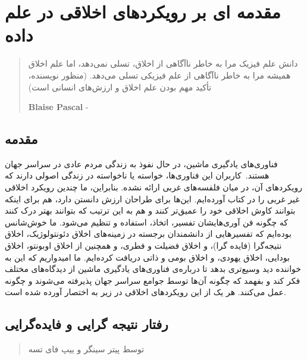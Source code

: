 

\chapter{مقدمه ای بر رویکردهای اخلاقی در علم داده}
\label{ch:مقدمه ای بر رویکردهای اخلاقی در علم داده}

\begin{quote}
    دانش علم فیزیک مرا به خاطر ناآگاهی از اخلاق، تسلی نمی‌دهد، اما علم اخلاق همیشه مرا به خاطر ناآگاهی از علم فیزیکی تسلی می‌دهد.
    (منظور نویسنده، تأکید مهم بودن علم اخلاق و ارزش‌های انسانی است)
    \begin{flushleft}
        \textenglish{\textbf{Blaise Pascal} -}
    \end{flushleft}
\end{quote}

\section*{مقدمه}
\label{sec:مقدمه}
فناوری‌های یادگیری ماشین، در حال نفوذ به زندگی مردم عادی در سراسر جهان هستند.\     كاربران اين فناوری‌ها، خواسته یا ناخواسته در زندگی اصولی دارند که رویکردهای آن، در میان فلفسه‌های غربی ارائه نشده.
بنابراین، ما چندین رویکرد اخلاقی غیر غربی را در کتاب آورده‌ایم.
این‌ها برای طراحان ارزش دانستن دارد، هم برای اینکه بتوانند کاوش اخلاقی خود را عمیق‌تر کنند و هم به این ترتیب که بتوانند بهتر درک کنند که چگونه فن آوری‌هایشان تفسیر، اتخاذ، استفاده و تنظیم می‌شود.
ما خوش‌شانس بوده‌ایم که تفسیرهایی از دانشمندان برجسته در زمینه‌های اخلاق دئونتولوژیک، اخلاق نتیجه‌گرا (فایده گرا)، و اخلاق فضیلت و فطری، و همچنین از اخلاق اوبونتو، اخلاق بودایی، اخلاق یهودی، و اخلاق بومی و ذاتی دریافت کرده‌ایم.
ما امیدواریم که این به خواننده دید وسیع‌تری بدهد تا درباره‌ی فناوری‌های یادگیری ماشین از دیدگاه‌های مختلف فکر کند و بفهمد که چگونه آن‌ها توسط جوامع سراسر جهان پذیرفته می‌شوند و چگونه عمل می‌کنند.
هر یک از این رویکردهای اخلاقی در زیر به اختصار آورده شده است.


\section*{رفتار نتیجه گرایی و فایده‌گرایی}
\label{sec:رفتار نتیجه گرایی و فایده‌گرایی}
\begin{quote}
    توسط پیتر سینگر و ییپ فای تسه
\end{quote}

